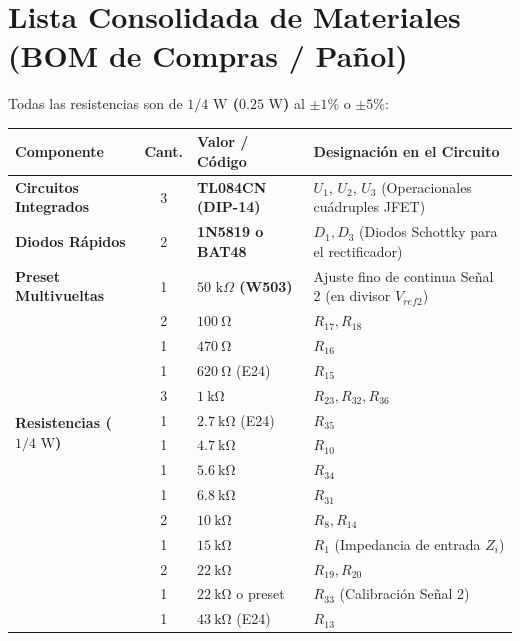 \documentclass[10pt, a4paper]{article}
\begin{document}
\newpage

\section{Lista Consolidada de Materiales (BOM de Compras / Pañol)}

Todas las resistencias son de \textbf{$1/4\text{ W}$ ($0.25\text{ W}$)} al $\pm 1\%$ o $\pm 5\%$:

\begin{table}[H]
\centering
\small
\renewcommand{\arraystretch}{1.2}
\begin{tabularx}{\textwidth}{l c l X}
\toprule
\textbf{Componente} & \textbf{Cant.} & \textbf{Valor / Código} & \textbf{Designación en el Circuito} \\
\midrule
\rowcolor{softgray} \textbf{Circuitos Integrados} & 3 & \textbf{TL084CN (DIP-14)} & $U_1$, $U_2$, $U_3$ (Operacionales cuádruples JFET) \\
\textbf{Diodos Rápidos} & 2 & \textbf{1N5819 o BAT48} & $D_1, D_3$ (Diodos Schottky para el rectificador) \\
\rowcolor{softgray} \textbf{Preset Multivueltas} & 1 & \textbf{$50\text{ k}\Omega$ (W503)} & Ajuste fino de continua Señal 2 (en divisor $V_{ref2}$) \\
\midrule
\multirow{10}{*}{\textbf{Resistencias ($1/4\text{ W}$)}} 
& 2 & $\SI{100}{\ohm}$ & $R_{17}, R_{18}$ \\
& 1 & $\SI{470}{\ohm}$ & $R_{16}$ \\
& 1 & $\SI{620}{\ohm}$ (E24) & $R_{15}$ \\
& 3 & $\SI{1}{\kilo\ohm}$ & $R_{23}, R_{32}, R_{36}$ \\
& 1 & $\SI{2.7}{\kilo\ohm}$ (E24) & $R_{35}$ \\
& 1 & $\SI{4.7}{\kilo\ohm}$ & $R_{10}$ \\
& 1 & $\SI{5.6}{\kilo\ohm}$ & $R_{34}$ \\
& 1 & $\SI{6.8}{\kilo\ohm}$ & $R_{31}$ \\
& 2 & $\SI{10}{\kilo\ohm}$ & $R_8, R_{14}$ \\
& 1 & $\SI{15}{\kilo\ohm}$ & $R_1$ (Impedancia de entrada $Z_i$) \\
& 2 & $\SI{22}{\kilo\ohm}$ & $R_{19}, R_{20}$ \\
& 1 & $\SI{22}{\kilo\ohm}$ o preset & $R_{33}$ (Calibración Señal 2) \\
& 1 & $\SI{43}{\kilo\ohm}$ (E24) & $R_{13}$ \\

\end{tabularx}
\end{table}
\end{document}
